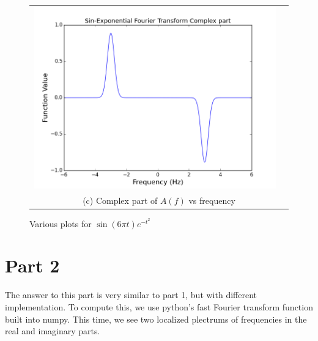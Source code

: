 \documentclass[11pt]{article}
\begin{document}
\begin{figure}[H]
\begin{tabular}{cc}
\includegraphics[scale=.4]{sin_fourComp.png}\\
\multicolumn{2}{c}{(c) Complex part of $A(f)$ vs frequency} \\[6pt]
\end{tabular}
\caption{Various plots for $\sin (6\pi t) e^{-t^2} $}
\end{figure}


\section{Part 2}

The answer to this part is very similar to part 1, but with different implementation. To compute this, we use python's fast Fourier transform function built into numpy. This time, we see two localized plectrums of frequencies in the real and imaginary parts. 
\end{document}
